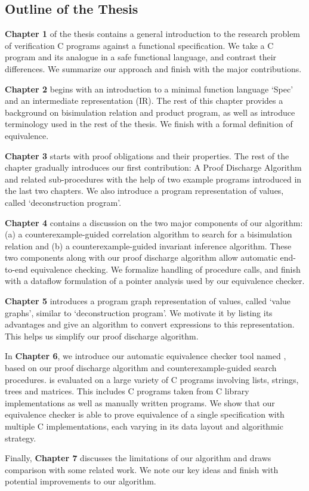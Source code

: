 

\subsection{Outline of the Thesis}
\label{sec:outline}
\textbf{Chapter 1} of the thesis contains a general introduction to the research problem of verification C programs against a functional specification.
We take a C program and its analogue in a safe functional language, and contrast their differences.
We summarize our approach and finish with the major contributions.

\textbf{Chapter 2} begins with an introduction to a minimal function language `Spec' and an intermediate representation (IR).
The rest of this chapter provides a background on bisimulation relation and product program, as well as
introduce terminology used in the rest of the thesis.
We finish with a formal definition of equivalence.

\textbf{Chapter 3} starts with proof obligations and their properties.
The rest of the chapter gradually introduces our first contribution: A Proof Discharge Algorithm and related sub-procedures with the help
of two example programs introduced in the last two chapters. We also introduce a program representation of values, called `deconstruction program'.

\textbf{Chapter 4} contains a discussion on the two major components of our algorithm: (a) a counterexample-guided correlation algorithm
to search for a bisimulation relation and (b) a counterexample-guided invariant inference algorithm.
These two components along with our proof discharge algorithm allow automatic end-to-end equivalence checking.
We formalize handling of procedure calls, and finish with a dataflow formulation of a pointer analysis
used by our equivalence checker.

\textbf{Chapter 5} introduces a program graph representation of values, called `value graphs', similar to `deconstruction program'.
We motivate it by listing its advantages and give an algorithm to convert expressions to this representation.
This helps us simplify our proof discharge algorithm.

In \textbf{Chapter 6}, we introduce our automatic equivalence checker tool named \toolName{}, based on our proof discharge algorithm
and counterexample-guided search procedures.
\toolName{} is evaluated on a large variety of C programs involving lists, strings, trees and matrices.
This includes C programs taken from C library implementations as well as manually written programs. We show that our equivalence checker is able
to prove equivalence of a single specification with multiple C implementations, each varying in its data layout and algorithmic strategy.

Finally, \textbf{Chapter 7} discusses the limitations of our algorithm and draws comparison with some related work.
We note our key ideas and finish with potential improvements to our algorithm.